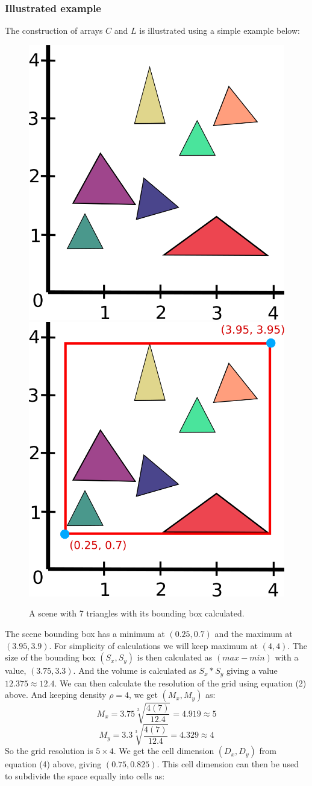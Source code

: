 \documentclass[11pt,a4paper]{article}
\begin{document}
\subsubsection{Illustrated example}
The construction of arrays $C$ and $L$ is illustrated using a simple example below:
\begin{figure}[H]
	\centering
	\captionsetup{justification=centering}
	\includegraphics[width=.4\textwidth]{compact_grid_1}\quad
	\includegraphics[width=.4\textwidth]{compact_grid_2}\quad
	\caption{A scene with 7 triangles with its bounding box calculated.}
\end{figure}
\noindent
The scene bounding box has a minimum at $(0.25, 0.7)$ and the maximum at $(3.95, 3.9)$. For simplicity of calculations we will keep maximum at $(4, 4)$. The size of the bounding box $(S_{x}, S_{y})$ is then calculated as $(max - min)$ with a value, $(3.75, 3.3)$. And the volume is calculated as $S_{x} * S_{y}$ giving a value $12.375 \approx 12.4$. We can then calculate the resolution of the grid using equation (2) above. And keeping density $\rho=4$, we get $(M_{x}, M_{y})$ as:
\begin{equation}
	M_{x}=3.75 \sqrt[3]{\frac{4(7)}{12.4}}=4.919 \approx 5
\end{equation} 
\begin{equation}
M_{y}=3.3 \sqrt[3]{\frac{4(7)}{12.4}}=4.329 \approx 4
\end{equation} 
So the grid resolution is $5 \times 4$. We get the cell dimension $(D_{x}, D_{y})$ from equation (4) above, giving $(0.75, 0.825)$. This cell dimension can then be used to subdivide the space equally into cells as:
\end{document}
